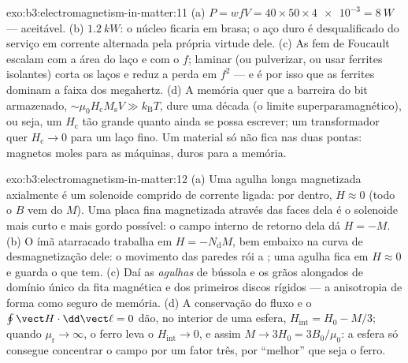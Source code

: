 \begin{solution}{exo:b3:electromagnetism-in-matter:11}
(a) $P = wfV = 40\times50\times\num{4e-3} = \qty{8}{W}$ ---
aceitável. (b) $\qty{1.2}{kW}$: o núcleo ficaria em brasa; o aço duro
é desqualificado do serviço em corrente alternada pela própria virtude
dele. (c) As fem de Foucault escalam com a área do laço e com o $f$;
laminar (ou pulverizar, ou usar ferrites isolantes) corta os laços e
reduz a perda em $f^2$ --- e é por isso que as ferrites dominam a faixa
dos megahertz. (d) A memória quer que a barreira do bit armazenado,
$\sim\mu_0H_{\text{c}}M_{\text{s}}V \gg
k_{\text{B}}T$, dure uma década (o limite superparamagnético), ou seja,
um $H_{\text{c}}$ tão grande quanto ainda se possa escrever; um
transformador quer $H_{\text{c}} \to 0$ para um laço fino. Um material
só não fica nas duas pontas: magnetos moles para as máquinas, duros para a memória.
\end{solution}

\begin{solution}{exo:b3:electromagnetism-in-matter:12}
(a) Uma agulha longa magnetizada axialmente é um solenoide comprido de
corrente ligada: por dentro, $H \approx 0$ (todo o $B$ vem do $M$). Uma
placa fina magnetizada através das faces dela é o solenoide mais curto e
mais gordo possível: o campo interno de retorno dela dá $H = -M$. (b)
O ímã atarracado trabalha em $H = -N_{\text{d}}M$, bem embaixo na
curva de desmagnetização dele: o movimento das paredes rói a ; uma
agulha fica em $H \approx 0$ e guarda o que tem. (c) Daí as
\emph{agulhas} de bússola e os grãos alongados de domínio único da
fita magnética e dos primeiros discos rígidos --- a anisotropia de forma
como seguro de memória. (d) A conservação do fluxo e o $\oint\vect H\cdot
\dd\vect\ell = 0$ dão, no interior de uma esfera, $H_{\text{int}} =
H_0 - M/3$; quando $\mu_{\text{r}}\to\infty$, o ferro leva o
$H_{\text{int}}\to0$, e assim $M \to 3H_0 = 3B_0/\mu_0$: a esfera só
consegue concentrar o campo por um fator três, por ``melhor'' que seja o ferro.
\end{solution}

